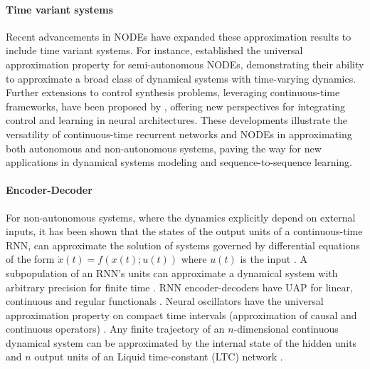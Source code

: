 \documentclass{article}
\newcounter{ct}
\begin{document}
\paragraph{Time variant systems}
Recent advancements in NODEs have expanded these approximation results to include time variant systems. For instance, \citet{li2024universal} established the universal approximation property for semi-autonomous NODEs, demonstrating their ability to approximate a broad class of dynamical systems with time-varying dynamics. Further extensions to control synthesis problems, leveraging continuous-time frameworks, have been proposed by \citet{mei2024controlsynth}, offering new perspectives for integrating control and learning in neural architectures.
%
These developments illustrate the versatility of continuous-time recurrent networks and NODEs in approximating both autonomous and non-autonomous systems, paving the way for new applications in dynamical systems modeling and sequence-to-sequence learning.


\paragraph{Encoder-Decoder}
For non-autonomous systems, where the dynamics explicitly depend on external inputs, it has been shown that the states of the output units of a continuous-time RNN, can approximate the solution of systems governed by differential equations of the form $\dot{x}(t) = f(x(t); u(t))$ where $u(t)$ is the input  \citep{garces2012strategies}. %
A subpopulation of an RNN's units can approximate a dynamical system with arbitrary precision for finite time \citep{kambhampati2000approximation}. %
RNN encoder-decoders have UAP for linear, continuous and regular functionals \citep{li2021approximationencdec}.
Neural oscillators have the universal approximation property on compact time intervals (approximation of causal and continuous operators)  \citep{lanthaler2023neuraloscillators}.
%
Any finite trajectory of an $n$-dimensional continuous dynamical system can be approximated by the internal state of the hidden units and $n$ output units of an Liquid time-constant (LTC) network  \citep{hasani2018liquid}.
\end{document}
